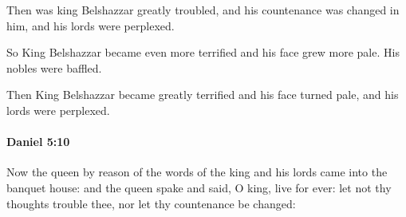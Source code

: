 			\begin{versebox}
					\item[BHS] 
					\item[LXX] 
					\item[ASV] Then was king Belshazzar greatly troubled, and his countenance was changed in him, and his lords were perplexed.
					\item[NIV] So King Belshazzar became even more terrified and his face grew more pale. His nobles were baffled.
					\item[NRSV] Then King Belshazzar became greatly terrified and his face turned pale, and his lords were perplexed.
			\end{versebox}

		\paragraph{Daniel 5:10} %
			\label{DANIEL-5-10}

			Now the queen by reason of the words of the king and his lords came into the banquet house: and the queen spake and said, O king, live for ever: let not thy thoughts trouble thee, nor let thy countenance be changed:

